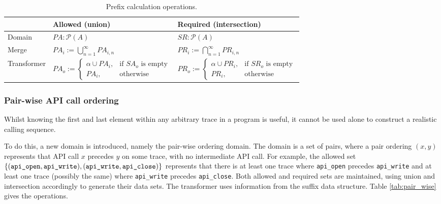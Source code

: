 \documentclass[EPiC]{easychair}
\begin{document}
\begin{table}
	\renewcommand{\arraystretch}{1.4}
	\centering
	
	\label{tab:prefix_ops}
	\begin{tabular}{|l|l|l|}
		\hline
		& Allowed (union) &  Required (intersection) \\\hline
		Domain	& $ PA : \mathcal{P}(A)$ &$ SR : \mathcal{P}(A)$ \\
		Merge	& $PA_i := \bigcup_{n=1}^{\infty} PA_{i,n}$ & $PR_i := \bigcap_{n=1}^{\infty} PR_{i,n}$\\
		Transformer	& $PA_o := 
		\begin{cases}
		\alpha \cup PA_i, & \text{if }SA_o\text{ is empty}\\
		PA_i,              & \text{otherwise}
		\end{cases}$ & $PR_o := \begin{cases}
		\alpha \cup PR_i, & \text{if }SR_o\text{ is empty}\\
		PR_i,              & \text{otherwise}
		\end{cases}$ \\\hline
		
	\end{tabular}
	\caption{Prefix calculation operations.}
\end{table}





\subsubsection{Pair-wise API call ordering}
Whilst knowing the first and last element within any arbitrary trace in a program is useful, it cannot be used alone to construct a realistic calling sequence.

To do this, a new domain is introduced, namely the pair-wise ordering domain.  The domain is a set of pairs, where a pair ordering $(x, y)$ represents that API call $x$ precedes $y$ on some trace, with no intermediate  API call.  For example, the allowed set $\{(\text{\texttt{api\_open}}, \text{\texttt{api\_write}}), (\text{\texttt{api\_write}}, \text{\texttt{api\_close}})\}$ represents that there is at least one trace where \texttt{api\_open} precedes \texttt{api\_write} and at least one trace (possibly the same) where \texttt{api\_write} precedes \texttt{api\_close}. Both allowed and required sets are maintained, using union and intersection accordingly to generate their data sets.  The transformer uses information from the suffix data structure.  Table \ref{tab:pair_wise} gives the operations.
\end{document}
